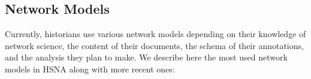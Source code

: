 \subsection{Network Models}

Currently, historians use various network models depending on their knowledge of network science, the content of their documents, the schema of their annotations, and the analysis they plan to make. We describe here the most used network models in HSNA along with more recent ones:

